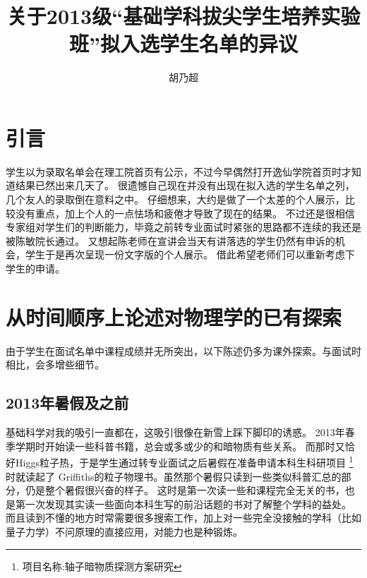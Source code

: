 \documentclass[10pt,a4paper]{article}
\title{关于2013级“基础学科拔尖学生培养实验班”拟入选学生名单的异议}
\author{胡乃超}
\date{}
\begin{document}
\begin{spacing}{1.6}
\maketitle
\section{引言}
学生以为录取名单会在理工院首页有公示，不过今早偶然打开逸仙学院首页时才知道结果已然出来几天了。
很遗憾自己现在并没有出现在拟入选的学生名单之列，几个友人的录取倒在意料之中。
仔细想来，大约是做了一个太差的个人展示，比较没有重点，加上个人的一点怯场和疲倦才导致了现在的结果。
不过还是很相信专家组对学生们的判断能力，毕竟之前转专业面试时紧张的思路都不连续的我还是被陈敏院长通过。
又想起陈老师在宣讲会当天有讲落选的学生仍然有申诉的机会，学生于是再次呈现一份文字版的个人展示。
借此希望老师们可以重新考虑下学生的申请。\par

\section{从时间顺序上论述对物理学的已有探索}
由于学生在面试名单中课程成绩并无所突出，以下陈述仍多为课外探索。与面试时相比，会多增些细节。
\subsection{2013年暑假及之前}
基础科学对我的吸引一直都在，这吸引很像在新雪上踩下脚印的诱惑。
2013年春季学期时开始读一些科普书籍，总会或多或少的和暗物质有些关系。
而那时又恰好Higgs粒子热，于是学生通过转专业面试之后暑假在准备申请本科生科研项目
\footnote{项目名称:轴子暗物质探测方案研究}时就读起了
Griffiths的粒子物理书\cite{grif-ep}。虽然那个暑假只读到一些类似科普汇总的部分，仍是整个暑假很兴奋的样子。
这时是第一次读一些和课程完全无关的书，也是第一次发现其实读一些面向本科生写的前沿话题的书对了解整个学科的益处。
而且读到不懂的地方时常需要很多搜索工作，加上对一些完全没接触的学科（比如量子力学）不问原理的直接应用，对能力也是种锻炼。

\end{spacing}
\end{document}
